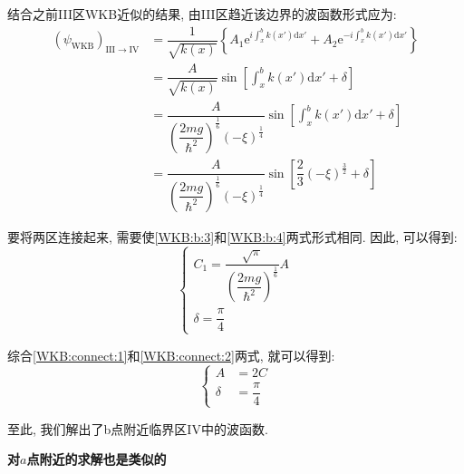 \documentclass[a4paper, 11pt]{article}
\begin{document}
\begin{spacing}{1.2}
          结合之前III区WKB近似的结果, 由III区趋近该边界的波函数形式应为:
          \begin{equation}
            \label{WKB:b:4}
            \begin{aligned}
              (\psi_{\mathrm{WKB}})_{\mathrm{III}\to\mathrm{IV}} &= \dfrac{1}{\sqrt{k(x)}} %
              \left\{A_1\mathrm{e}^{i\int_x^bk(x')\mathrm{d}x'} + %
                    A_2\mathrm{e}^{-i\int_x^bk(x')\mathrm{d}x'}\right\}\\
                    &= \dfrac{A}{\sqrt{k(x)}}\sin\left[\int_x^bk(x')\mathrm{d}x'+\delta\right]\\
                    &= \dfrac{A}{\left(\dfrac{2mg}{\hbar^2}\right)^{\frac{1}{6}}(-\xi)^{\frac{1}{4}}}%
                    \sin\left[\int_x^bk(x')\mathrm{d}x'+\delta\right]\\
                    &= \dfrac{A}{\left(\dfrac{2mg}{\hbar^2}\right)^{\frac{1}{6}}(-\xi)^{\frac{1}{4}}}%
                    \sin\left[\dfrac{2}{3}(-\xi)^{\frac{3}{2}}+\delta\right]
            \end{aligned}
          \end{equation}

          要将两区连接起来, 需要使\eqref{WKB:b:3}和\eqref{WKB:b:4}两式形式相同. 因此, 可以得到:
          \begin{equation}
            \label{WKB:connect:2}
            \left\{\begin{array}{l}
              C_1 = \dfrac{\sqrt{\pi}}{\left(\dfrac{2mg}{\hbar^2}\right)^{\frac{1}{6}}}A\\
              \delta = \dfrac{\pi}{4}
            \end{array}\right.
          \end{equation}

          综合\eqref{WKB:connect:1}和\eqref{WKB:connect:2}两式, 就可以得到:
          \begin{equation}
            \left\{
            \begin{aligned}
              A &= 2C\\
              \delta &= \dfrac{\pi}{4}
            \end{aligned}\right.
          \end{equation}

          至此, 我们解出了b点附近临界区IV中的波函数. 

          \textbf{对$a$点附近的求解也是类似的}


\end{spacing}
\end{document}
